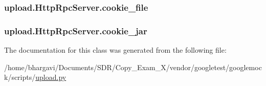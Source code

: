 \subsubsection[{\texorpdfstring{cookie\+\_\+file}{cookie_file}}]{\setlength{\rightskip}{0pt plus 5cm}upload.\+Http\+Rpc\+Server.\+cookie\+\_\+file}\hypertarget{classupload_1_1_http_rpc_server_ad5c1a730c030f9d3b5f70c2e0d8b9a1d}{}\label{classupload_1_1_http_rpc_server_ad5c1a730c030f9d3b5f70c2e0d8b9a1d}
\subsubsection[{\texorpdfstring{cookie\+\_\+jar}{cookie_jar}}]{\setlength{\rightskip}{0pt plus 5cm}upload.\+Http\+Rpc\+Server.\+cookie\+\_\+jar}\hypertarget{classupload_1_1_http_rpc_server_a1b9c9af7f0a46afd84a9d524782323bf}{}\label{classupload_1_1_http_rpc_server_a1b9c9af7f0a46afd84a9d524782323bf}


The documentation for this class was generated from the following file\+:\begin{DoxyCompactItemize}
\item 
/home/bhargavi/\+Documents/\+S\+D\+R/\+Copy\+\_\+\+Exam\+\_\+X/vendor/googletest/googlemock/scripts/\hyperlink{googlemock_2scripts_2upload_8py}{upload.\+py}\end{DoxyCompactItemize}
